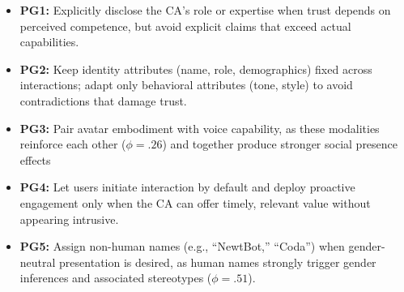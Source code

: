 \documentclass[manuscript,anonymous,sigconf]{acmart}
\begin{document}
\begin{itemize}
    \item \textbf{PG1:} Explicitly disclose the CA's role or expertise when trust depends on perceived competence, but avoid explicit claims that exceed actual capabilities.
    \item \textbf{PG2:} Keep identity attributes (name, role, demographics) fixed across interactions; adapt only behavioral attributes (tone, style) to avoid contradictions that damage trust.
    \item \textbf{PG3:} Pair avatar embodiment with voice capability, as these modalities reinforce each other ($\phi = .26$) and together produce stronger social presence effects
    \item \textbf{PG4:} Let users initiate interaction by default and deploy proactive engagement only when the CA can offer timely, relevant value without appearing intrusive.
    \item \textbf{PG5:} Assign non-human names (e.g., ``NewtBot,'' ``Coda'') when gender-neutral presentation is desired, as human names strongly trigger gender inferences and associated stereotypes ($\phi = .51$).
\end{itemize}



\end{document}
